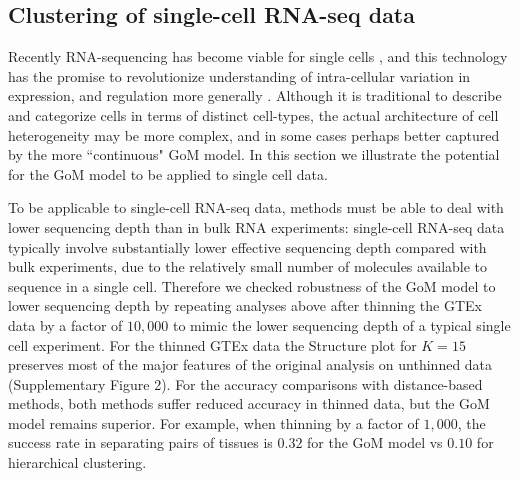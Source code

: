 \subsection{Clustering of single-cell RNA-seq data}

Recently RNA-sequencing has become viable for single cells \cite{Tang2009}, and this technology has the promise to revolutionize understanding of intra-cellular variation in expression, and regulation more generally \cite{Trapnell2015}. Although it is traditional to describe and categorize cells in terms of distinct cell-types, 
the actual architecture of cell heterogeneity may be more complex, and in some cases perhaps better captured by the more ``continuous"  GoM model. 
In this section we illustrate the potential for the GoM model to be applied to single cell data.

To be applicable to single-cell RNA-seq data, methods must be able to deal with lower sequencing depth than in bulk RNA experiments:
 single-cell RNA-seq data typically involve substantially lower effective sequencing depth compared with bulk experiments, due to the relatively small 
 number of molecules available to sequence in a single cell. Therefore we checked robustness of the GoM model to lower sequencing depth
by repeating analyses above after thinning the GTEx data by a factor of $10,000$ to mimic the lower sequencing depth of a typical single cell experiment.
For the thinned GTEx data the Structure plot for $K=15$ preserves most of the major features of the original analysis on unthinned data (Supplementary Figure 2). For the accuracy comparisons with distance-based methods, both methods suffer reduced accuracy in thinned data, but the GoM model remains superior. For example, when thinning by a factor of $1,000$, the success rate in separating pairs of tissues is $0.32$ for the GoM model vs $0.10$ for hierarchical clustering.



